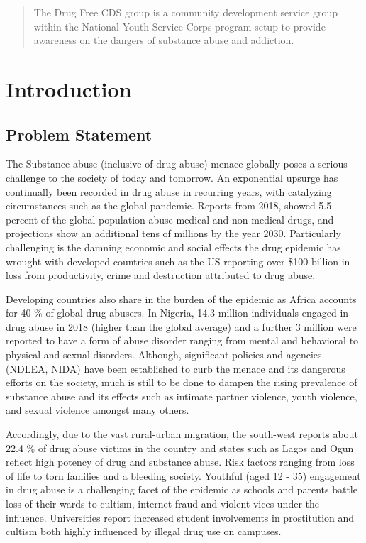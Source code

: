 \documentclass{report}
\begin{document}
\begin{abstract}
The Drug Free CDS group is a community development service group within the National Youth Service Corps program setup to provide awareness on the dangers of substance abuse and addiction.
\end{abstract}

\tableofcontents

\chapter{Introduction}
\section{Problem Statement}
The Substance abuse (inclusive of drug abuse) menace globally poses a serious challenge to the society of today and tomorrow. An exponential upsurge has continually been recorded in drug abuse in recurring years, with catalyzing circumstances such as the global pandemic. Reports from 2018, showed 5.5 percent of the global population abuse medical and non-medical drugs, and projections show an additional tens of millions by the year 2030. Particularly challenging is the damning economic and social effects the drug epidemic has wrought with developed countries such as the US reporting over \$100 billion in loss from productivity, crime and destruction attributed to drug abuse.

Developing countries also share in the burden of the epidemic as Africa accounts for 40 \% of global drug abusers. In Nigeria, 14.3 million individuals engaged in drug abuse in 2018 (higher than the global average) and a further 3 million were reported to have a form of abuse disorder ranging from mental and behavioral to physical and sexual disorders. Although, significant policies and agencies (NDLEA, NIDA) have been established to curb the menace and its dangerous efforts on the society, much is still to be done to dampen the rising prevalence of substance abuse and its effects such as intimate partner violence, youth violence, and sexual violence amongst many others. 

Accordingly, due to the vast rural-urban migration, the south-west reports about 22.4 \% of drug abuse victims in the country and states such as Lagos and Ogun reflect high potency of drug and substance abuse. Risk factors ranging from loss of life to torn families and a bleeding society. Youthful (aged 12 - 35) engagement in drug abuse is a challenging facet of the epidemic as schools and parents battle loss of their wards to cultism, internet fraud and violent vices under the influence. Universities report increased student involvements in prostitution and cultism both highly influenced by illegal drug use on campuses.
\end{document}
